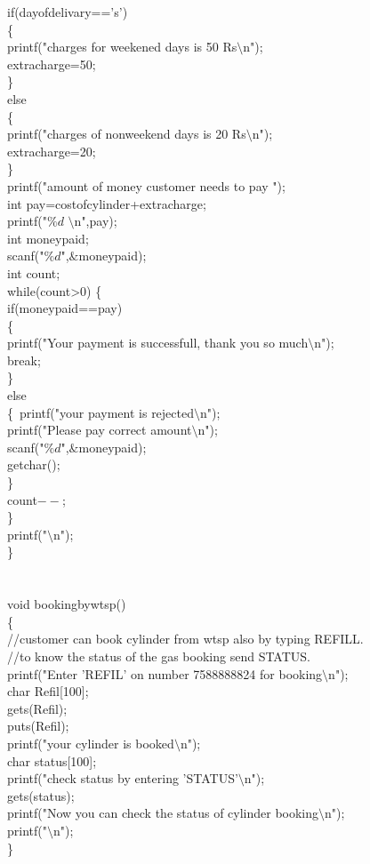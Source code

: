 \documentclass{article}
\begin{document}
{	if(dayofdelivary=='s')\\
	\{\\
		printf("charges for weekened days is 50 Rs$\setminus$n");\\
		extracharge=50;\\
	\}\\
	else\\
	\{\\
		printf("charges of nonweekend days is 20 Rs$\setminus$n");\\
		extracharge=20;\\
	\}\\
	printf("amount of money customer needs to pay  ");\\
	int pay=costofcylinder+extracharge;\\
	printf("$\%d$ $\setminus$n",pay);\\
	int moneypaid;\\
	scanf("$\%d$",$\&$moneypaid);\\
	int count;\\
	while(count>0)
	\{\\
	if(moneypaid==pay)\\
	\{\\
		printf("Your payment is successfull, thank you so much$\setminus$n");\\
		break;\\
	\}\\
	else\\
	\{\
		printf("your payment is rejected$\setminus$n");\\
		printf("Please pay correct amount$\setminus$n");\\
		scanf("$\%d$",$\&$moneypaid);\\
		getchar();\\
	\}\\
	 count$--$;\\

\}\\
	printf("$\setminus$n");\\
\}\\
\\
\\
void bookingbywtsp()\\
\{\\
	//customer can book cylinder from wtsp also by typing REFILL.\\
	//to know the status of the gas booking send STATUS.\\
	printf("Enter 'REFIL' on number 7588888824  for booking$\setminus$n");\\
	char Refil[100];\\
	gets(Refil);\\
	puts(Refil);\\
	printf("your cylinder is booked$\setminus$n");\\
	char status[100];\\
	printf("check status by entering 'STATUS'$\setminus$n");\\
	gets(status);\\
	printf("Now you can check the status of cylinder booking$\setminus$n");\\
		printf("$\setminus$n");\\
\}\\
 
}
\end{document}

